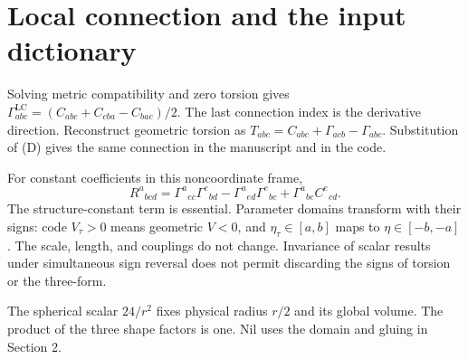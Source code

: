 \section{Local connection and the input dictionary}
\label{sec:revised11}

Solving metric compatibility and zero torsion gives $\Gamma^{\mathrm{LC}}_{abc}=(C_{abc}+C_{cba}-C_{bac})/2$. The last connection index is the derivative direction. Reconstruct geometric torsion as $T_{abc}=C_{abc}+\Gamma_{acb}-\Gamma_{abc}$. Substitution of (D) gives the same connection in the manuscript and in the code.

For constant coefficients in this noncoordinate frame,
\begin{equation}
R^a{}_{bcd}
=\Gamma^a{}_{ec}\Gamma^e{}_{bd}
-\Gamma^a{}_{ed}\Gamma^e{}_{bc}
+\Gamma^a{}_{be}C^e{}_{cd}.
\tag{CURV}\label{eq:CURV}
\end{equation}
The structure-constant term is essential. Parameter domains transform with their signs: code $V_\tau>0$ means geometric $V<0$, and $\eta_\tau\in[a,b]$ maps to $\eta\in[-b,-a]$. The scale, length, and couplings do not change. Invariance of scalar results under simultaneous sign reversal does not permit discarding the signs of torsion or the three-form.

The spherical scalar $24/r^2$ fixes physical radius $r/2$ and its global volume. The product of the three shape factors is one. Nil uses the domain and gluing in Section 2.
